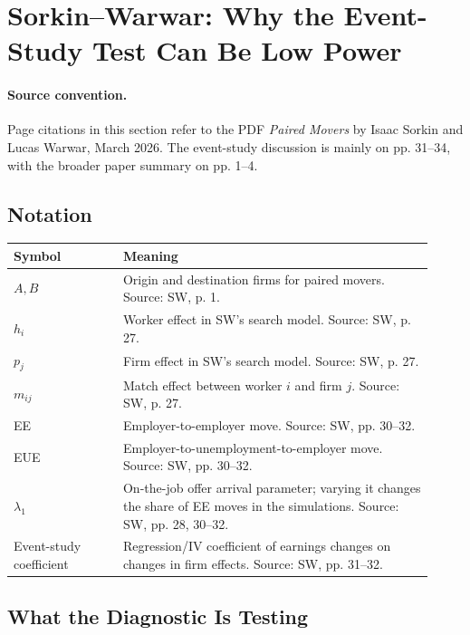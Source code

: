 \documentclass[11pt]{article}
\begin{document}
\section{Sorkin--Warwar: Why the Event-Study Test Can Be Low Power}

\paragraph{Source convention.}
Page citations in this section refer to the PDF \emph{Paired Movers} by Isaac
Sorkin and Lucas Warwar, March 2026. The event-study discussion is mainly on
pp. 31--34, with the broader paper summary on pp. 1--4.

\subsection{Notation}

\begin{center}
\begin{tabular}{>{\raggedright\arraybackslash}p{0.24\linewidth}
                >{\raggedright\arraybackslash}p{0.68\linewidth}}
\toprule
Symbol & Meaning \\
\midrule
$A,B$ & Origin and destination firms for paired movers. Source: SW, p. 1. \\
$h_i$ & Worker effect in SW's search model. Source: SW, p. 27. \\
$p_j$ & Firm effect in SW's search model. Source: SW, p. 27. \\
$m_{ij}$ & Match effect between worker $i$ and firm $j$. Source: SW, p. 27. \\
EE & Employer-to-employer move. Source: SW, pp. 30--32. \\
EUE & Employer-to-unemployment-to-employer move. Source: SW, pp. 30--32. \\
$\lambda_1$ & On-the-job offer arrival parameter; varying it changes the share of EE moves in the simulations. Source: SW, pp. 28, 30--32. \\
Event-study coefficient & Regression/IV coefficient of earnings changes on changes in firm effects. Source: SW, pp. 31--32. \\
\bottomrule
\end{tabular}
\end{center}

\subsection{What the Diagnostic Is Testing}
\end{document}
